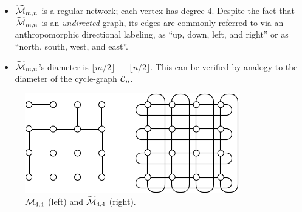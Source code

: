 \begin{itemize}
\begin{itemize}
\item
$\widetilde{\mbox{$\cal M$}}_{m,n}$ is a regular network; each vertex has degree $4$.  Despite the fact that $\widetilde{\mbox{$\cal M$}}_{m,n}$ is an {\em undirected} graph, its edges are commonly referred to via an  anthropomorphic directional labeling, as ``up, down, left, and right''  or as ``north, south, west, and east''.
  \medskip\item
$\widetilde{\mbox{$\cal M$}}_{m,n}$'s diameter is $\lfloor m/2 \rfloor \ + \ \lfloor n/2 \rfloor$.  This can be verified by analogy to the diameter of the cycle-graph $\mbox{$\cal C$}_n$.  
\end{itemize}
\end{itemize}

\begin{figure}[hbt]
\begin{center}
       \includegraphics[scale=0.6]{FiguresGraph/meshtorus}
       \caption{$\mbox{$\cal M$}_{4,4}$ (left) and $\widetilde{\mbox{$\cal M$}}_{4,4}$ (right).}
  \label{fig:torus}
\end{center}
\end{figure}

\bigskip

